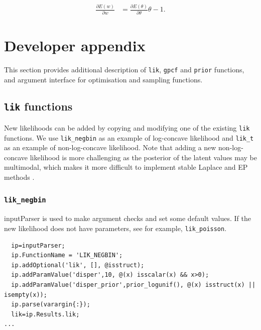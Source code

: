 \documentclass[twoside,11pt]{article}
\newcommand{\code}[1]{{\normalfont\texttt{#1}}}
\begin{document}
\begin{align}
\frac{\partial E(w)}{\partial w} 
 & = \frac{\partial E(\theta)}{\partial \theta}\theta-1.
\end{align}

\section{Developer appendix}\label{developer_appendix}

This section provides additional description of \code{lik},
\code{gpcf} and \code{prior} functions, and argument interface for
optimisation and sampling functions.

\subsection{\code{lik} functions}

New likelihoods can be added by copying and modifying one of the
existing \code{lik} functions. We use \code{lik\_negbin} as an
example of log-concave likelihood and \code{lik\_t} as an example
of non-log-concave likelihood. Note that adding a new
non-log-concave likelihood is more challenging as the posterior of
the latent values may be multimodal, which makes it more difficult
to implement stable Laplace and EP methods
\citep[see, e.g.,][]{Vanhatalo+Jylanki+Vehtari:2009,Jylanki+Vanhatalo+Vehtari:2011}.

\subsubsection{\code{lik\_negbin}}

inputParser is used to make argument checks and set some default
values. If the new likelihood does not have parameters, see for example,
\code{lik\_poisson}.
\begin{verbatim}
  ip=inputParser;
  ip.FunctionName = 'LIK_NEGBIN';
  ip.addOptional('lik', [], @isstruct);
  ip.addParamValue('disper',10, @(x) isscalar(x) && x>0);
  ip.addParamValue('disper_prior',prior_logunif(), @(x) isstruct(x) || isempty(x));
  ip.parse(varargin{:});
  lik=ip.Results.lik;
...
\end{verbatim}
\end{document}
